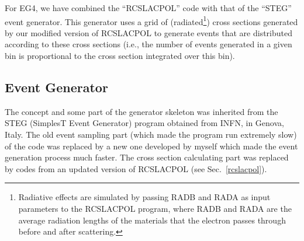 
For EG4, we have combined the %
``RCSLACPOL'' code with that of the ``STEG'' event generator. This generator uses a grid of (radiated\footnote{Radiative effects are simulated by passing RADB and RADA as input parameters to the RCSLACPOL program, where RADB and RADA are the average radiation lengths of the materials that the electron passes through before and after scattering. }) %
cross sections generated by our modified version of RCSLACPOL to generate events that are distributed according to these cross sections %
(i.e., the number of events generated in a given bin is proportional to the cross section integrated over this bin).


\subsection{Event Generator}
\label{evGen}


The concept and some part of the generator skeleton was inherited from the STEG (SimplesT Event Generator) %
 program obtained from INFN, in Genova, Italy. The old event sampling part (which made the program run extremely slow) of the code was replaced by a new one developed by myself which made the event generation process much faster. %
The cross section calculating part was replaced by codes from an updated version of RCSLACPOL (see Sec.~\ref{rcslacpol}).


